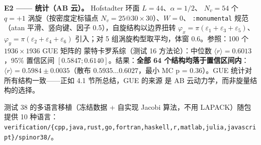 \documentclass[
]{article}
\begin{document}
\textbf{E2 ------ 统计（AB 云）。} Hofstadter 环面
\(L=44\)、\(\alpha=1/2\)、 \(N_v=54\) 个 \(q=+1\) 涡旋（按密度定标锚点
\(N_v=25\)@\(30\times30\)）、\(W=0\)、 \texttt{:monumental} 规范（atan
平滑、竖向键、因子 0.5），自旋结构以边界扭转
\(\varphi_x=\pi(\varepsilon_1+\varepsilon_3+\varepsilon_5)\)、
\(\varphi_y=\pi(\varepsilon_2+\varepsilon_4+\varepsilon_6)\) 引入；对 5
组涡旋构型取平均，体窗 0.6。参照：100 个 \(1936\times1936\) GUE 矩阵的
蒙特卡罗系综（测试 16 方法论）：中位数
\(\langle r\rangle = 0.6013\)，95\% 置信区间
\([0.5847; 0.6140]\)。结果：\textbf{全部 64 个结构均落于置信区间内}：
\(\langle r\rangle = 0.5984\pm0.0035\)（散布 \(0.5935\dots0.6027\)，最小
MC p = 0.36）。GUE 统计对所有结构一致------正如 4.1 节所总结，GUE 的来源
是 AB 云动力学，而非旋量结构的选择。

测试 38 的多语言移植（冻结数据 + 自实现 Jacobi 算法，不用 LAPACK）随包
提供 10 种语言：
\texttt{verification/\{cpp,java,rust,go,fortran,haskell,r,matlab,julia,javascript\}/spinor38/}。
\end{document}
